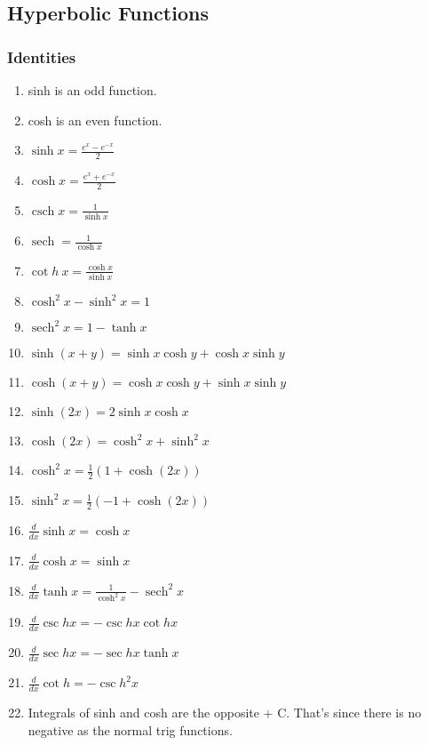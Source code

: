 \documentclass{article}
\DeclareMathOperator{\sech}{sech}
\DeclareMathOperator{\csch}{csch}
\begin{document}
\newpage

\subsection{Hyperbolic Functions}

\subsubsection{Identities}
\begin{enumerate}[1.]
	\item sinh is an odd function.
	\item cosh is an even function.
	\item $	\sinh x = \frac{ e^x - e^{-x}}{ 2  }$
	\item $	\cosh x = \frac{ e^x + e^{-x}}{ 2} $
\item $	\csch x = \frac{1}{\sinh x} $
\item ${\sech} = \frac{1}{\cosh x} $
\item $ \cot{h}\ x = \frac{\cosh x}{\sinh x} $ 
\item $ \cosh^2 x - \sinh^2x = 1 $
\item $\sech^2 x = 1- \tanh x$
\item $ \sinh(x+y) = \sinh x \cosh y + \cosh x \sinh y $
\item $ \cosh(x+y) = \cosh x \cosh y + \sinh x \sinh y $
\item $ \sinh(2x) = 2 \sinh x \cosh x$ 
\item $ \cosh(2x) = \cosh^2x+ \sinh^2x $ 
\item $ \cosh^2x = \frac{1}{2} (1+ \cosh(2x)) $ 
\item $ \sinh^2x = \frac{1}{2} (-1+ \cosh(2x)) $ 


\item 		
$	\frac{d}{dx} \sinh x = \cosh x $
\item $ \frac{d}{dx} \cosh x = \sinh x $ 
	\item $ \frac{d}{dx} \tanh x = \frac{1}{\cosh^2 x} - \sech^2 x $
		\item $ \frac{d}{dx} \csc h x = - \csc h x \cot h x $ 
			\item $ \frac{d}{dx} \sec h x = - \sec h x \tanh x $ 
				\item $ \frac{d}{dx} \cot h = - \csc h ^2 x $
		\item Integrals of sinh and cosh are the opposite + C. That's since there is no negative as the normal trig functions.



\end{enumerate}
\end{document}
